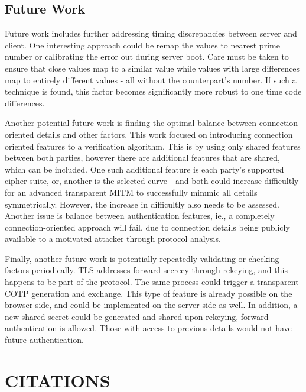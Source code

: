 \documentclass[a4paper, 11pt]{article} 				%
\begin{document}
\subsection{Future Work}
Future work includes further addressing timing discrepancies between server and client. One interesting approach could be remap the values to nearest prime number or calibrating the error out during server boot. Care must be taken to ensure that close values map to a similar value while values with large differences map to entirely different values - all without the counterpart's number. If such a technique is found, this factor becomes significantly more robust to one time code differences.

Another potential future work is finding the optimal balance between connection oriented details and other factors. This work focused on introducing connection oriented features to a verification algorithm. This is by using only shared features between both parties, however there are additional features that are shared, which can be included. One such additional feature is each party's supported cipher suite, or, another is the selected curve - and both could increase difficultly for an advanced transparent MITM to successfully mimmic all details symmetrically. However, the increase in difficultly also needs to be assessed. Another issue is balance between authentication features, ie., a completely connection-oriented approach will fail, due to connection details being publicly available to a motivated attacker through protocol analysis.

Finally, another future work is potentially repeatedly validating or checking factors periodically. TLS addresses forward secrecy through rekeying, and this happens to be part of the protocol. The same process could trigger a transparent COTP generation and exchange. This type of feature is already possible on the browser side, and could be implemented on the server side as well. In addition, a new shared secret could be generated and shared upon rekeying, forward authentication is allowed. Those with access to previous details would not have future authentication. 



\section{CITATIONS } 	%
\end{document}
